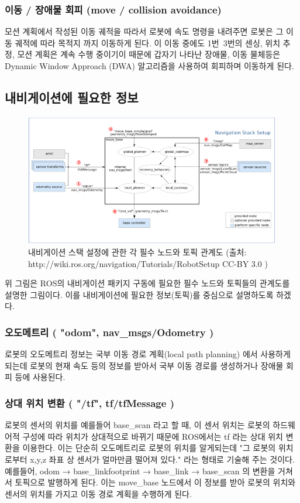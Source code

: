 \subsubsection{이동 / 장애물 회피 (move / collision avoidance)}
모션 계획에서 작성된 이동 궤적을 따라서 로봇에 속도 명령을 내려주면 로봇은 그 이동 궤적에 따라 목적지 까지 이동하게 된다. 이 이동 중에도 1번~3번의 센싱, 위치 추정, 모션 계획은 계속 수행 중이기이 때문에 갑자기 나타난 장애물, 이동 물체등은 Dynamic Window Approach (DWA) 알고리즘을 사용하여 회피하며 이동하게 된다.

\subsection{내비게이션에 필요한 정보}

\begin{figure}[h]
\centering
\includegraphics[width=\columnwidth]{pictures/chapter11/navigation_full_flow.png}
\caption{내비게이션 스택 설정에 관한 각 필수 노드와 토픽 관계도 (출처: http://wiki.ros.org/navigation/Tutorials/RobotSetup CC-BY 3.0 )}
\end{figure}

위 그림은 ROS의 내비게이션 패키지 구동에 필요한 필수 노드와 토픽들의 관계도를 설명한 그림이다. 이를 내비게이션에 필요한 정보(토픽)를 중심으로 설명하도록 하겠다.

\subsubsection{오도메트리 ( "odom", nav\_msgs/Odometry )}
로봇의 오도메트리 정보는 국부 이동 경로 계획(local path planning) 에서 사용하게 되는데 로봇의 현재 속도 등의 정보를 받아서 국부 이동 경로를 생성하거나 장애물 회피 등에 사용된다.

\subsubsection{상대 위치 변환 ( "/tf", tf/tfMessage )}
로봇의 센서의 위치를 예를들어 base\_scan 라고 할 때, 이 센서 위치는 로봇의 하드웨어적 구성에 따라 위치가 상대적으로 바뀌기 때문에 ROS에서는 tf 라는 상대 위치 변환을 이용한다. 이는 단순히 오도메트리로 로봇의 위치를 알게되는데 "그 로봇의 위치로부터 x,y,z 좌표 상 센서가 얼마만큼 떨어져 있다." 라는 형태로 기술해 주는 것이다. 예를들어,  odom → base\_linkfootprint → base\_link → base\_scan 의 변환을 거쳐서 토픽으로 발행하게 된다. 이는 move\_base 노드에서 이 정보를 받아 로봇의 위치와 센서의 위치를 가지고 이동 경로 계획을 수행하게 된다.

